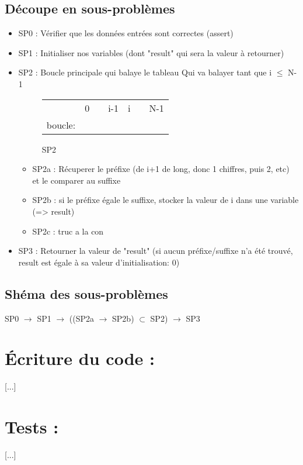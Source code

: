 \documentclass[a4paper, 11pt, oneside]{article}
\begin{document}
	\subsection{Découpe en sous-problèmes}
		\begin{itemize}
		
			\item SP0 : Vérifier que les données entrées sont correctes (assert)
			\item SP1 : Initialiser nos variables (dont "result" qui sera la valeur à retourner)
			\item SP2 : Boucle principale qui balaye le tableau
				\newline
				Qui va balayer tant que i $\leq$ N-1
				\begin{figure}[!h]
					\centering
					\begin{tabular}{l|llr|ll|l}
						& 0 &  & \multicolumn{1}{r|}{i-1} & i &  & N-1 \\ \cline{2-6}
						boucle: & \cellcolor[HTML]{FFCC67} & \cellcolor[HTML]{FFCC67} & \cellcolor[HTML]{FFCC67} &  &  &  \\ \cline{2-6}
					\end{tabular}
					\caption{SP2}
					\label{fig:exemple}
				\end{figure}
				\begin{itemize}
					\item SP2a : Récuperer le préfixe (de i+1 de long, donc 1 chiffres, puis 2, etc) et le comparer au suffixe
					\item SP2b : si le préfixe égale le suffixe, stocker la valeur de i dans une variable (=> result)
                    \item SP2c : truc a la con
				\end{itemize}
			\item SP3 : Retourner la valeur de "result" (si aucun préfixe/suffixe n'a été trouvé, result est égale à sa valeur d'initialisation: 0)
		\end{itemize}
	\subsection{Shéma des sous-problèmes}
		SP0 $\rightarrow$ SP1 $\rightarrow$ ((SP2a $\rightarrow$ SP2b) $\subset$ SP2) $\rightarrow$ SP3

\section{\LARGE \bfseries Écriture du code :}
	[...]

\section{\LARGE \bfseries Tests : }
	[...]
\end{document}
